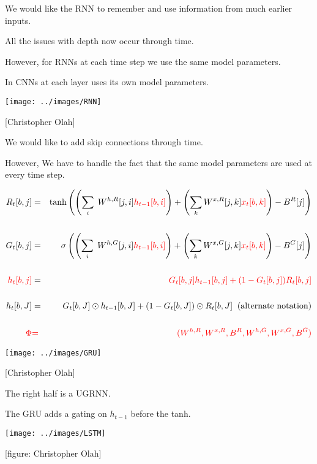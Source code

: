 {\vfill
We would like the RNN to {\color{red} remember and use} information from much earlier inputs.


\vfill
All the issues with depth now occur through time.

\vfill
However, for RNNs {\color{red} at each time step we use the same model parameters.}

\vfill
In CNNs {\color{red} at each layer uses its own model parameters.}


\centerline{\texttt{[image: ../images/RNN]}}
\centerline{{\large [Christopher Olah]}}

\vfill
We would like to add {\color{red} skip connections through time}.

\vfill
However, We have to handle the fact that the same model parameters are used at every time step.


{\huge
\begin{eqnarray*}
R_t[b,j] & = & \mathrm{tanh}\left(\left(\sum_i\;W^{h,R}[j,i]{\color{red} h_{t-1}[b,i]}\right) + \left(\sum_k W^{x,R}[j,k]{\color{red} x_t[b,k]}\right) - B^R[j]\right) \\
\\
G_t[b,j] & = & \sigma\left(\left(\sum_i\;W^{h,G}[j,i]{\color{red} h_{t-1}[b,i]}\right) + \left(\sum_k W^{x,G}[j,k]{\color{red} x_t[b,k]}\right) - B^G[j]\right) \\
\\
{\color{red} h_t[b,j]} & = & {\color{red} G_t[b,j]h_{t-1}[b,j] + (1-G_t[b,j])R_t[b,j]} \\
\\
h_t[b,J] & = & G_t[b,J] \odot h_{t-1}[b,J] + (1-G_t[b,J])\odot R_t[b,J]\;\;\mbox{(alternate notation)} \\
\\
{\color{red} \Phi} & {\color{red} =} & {\color{red} (W^{h,R},W^{x,R},B^R,W^{h,G},W^{x,G},B^G)}
\end{eqnarray*}
}


\centerline{\texttt{[image: ../images/GRU]}}
\centerline{{\huge [Christopher Olah]}}

\vfill
The right half is a UGRNN.

\vfill
The GRU adds a gating on $h_{t-1}$ before the tanh.

\centerline{\texttt{[image: ../images/LSTM]}}
\centerline{{\large [figure: Christopher Olah]}}

}
